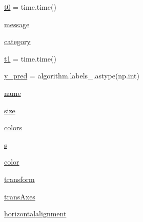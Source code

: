 \begin{DoxyCompactItemize}
\item 
\hyperlink{namespaceStreamClusteringAlgorithms_1_1evoStream_1_1v1_1_1Tests_1_1plot__cluster__comparison_a1ac8ef1d7eb7627ed9cb51323b61a579}{t0} = time.\+time()
\item 
\hyperlink{namespaceStreamClusteringAlgorithms_1_1evoStream_1_1v1_1_1Tests_1_1plot__cluster__comparison_a9d4cca70fe2625fae2ac52769b996317}{message}
\item 
\hyperlink{namespaceStreamClusteringAlgorithms_1_1evoStream_1_1v1_1_1Tests_1_1plot__cluster__comparison_a999f20becb6303862a99102031ae83c8}{category}
\item 
\hyperlink{namespaceStreamClusteringAlgorithms_1_1evoStream_1_1v1_1_1Tests_1_1plot__cluster__comparison_ad8d14fa3f84ca65ced58af0edfeba169}{t1} = time.\+time()
\item 
\hyperlink{namespaceStreamClusteringAlgorithms_1_1evoStream_1_1v1_1_1Tests_1_1plot__cluster__comparison_aaccdd19994be62196559c84f4938af12}{y\+\_\+pred} = algorithm.\+labels\+\_\+.\+astype(np.\+int)
\item 
\hyperlink{namespaceStreamClusteringAlgorithms_1_1evoStream_1_1v1_1_1Tests_1_1plot__cluster__comparison_a41bd2274956f30f5435bcaab9c0517c5}{name}
\item 
\hyperlink{namespaceStreamClusteringAlgorithms_1_1evoStream_1_1v1_1_1Tests_1_1plot__cluster__comparison_a95a505e3115d54215a1d5282759be3e5}{size}
\item 
\hyperlink{namespaceStreamClusteringAlgorithms_1_1evoStream_1_1v1_1_1Tests_1_1plot__cluster__comparison_a129f4504cf375baf75f92e34ceebf04d}{colors}
\item 
\hyperlink{namespaceStreamClusteringAlgorithms_1_1evoStream_1_1v1_1_1Tests_1_1plot__cluster__comparison_a9d538d8aa09518e61a29fa9fcbcfd8c6}{s}
\item 
\hyperlink{namespaceStreamClusteringAlgorithms_1_1evoStream_1_1v1_1_1Tests_1_1plot__cluster__comparison_a7110194cb34b21d6fa4cdb5bb81e3346}{color}
\item 
\hyperlink{namespaceStreamClusteringAlgorithms_1_1evoStream_1_1v1_1_1Tests_1_1plot__cluster__comparison_ad9e0e4736ce00569b0c680bbff2c1dc7}{transform}
\item 
\hyperlink{namespaceStreamClusteringAlgorithms_1_1evoStream_1_1v1_1_1Tests_1_1plot__cluster__comparison_a36c6602e05670a8a7f17ffddf312dcb7}{trans\+Axes}
\item 
\hyperlink{namespaceStreamClusteringAlgorithms_1_1evoStream_1_1v1_1_1Tests_1_1plot__cluster__comparison_a0565a2d800c9dbf4d85f255744583ca2}{horizontalalignment}
\end{DoxyCompactItemize}


